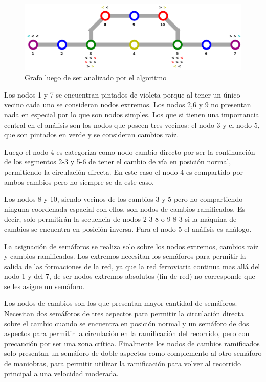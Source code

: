 	\begin{figure}[h]
	\centering
		\includegraphics[scale=.4]{./Figures/Mapa_2}
		\caption{Grafo luego de ser analizado por el algoritmo}
		\label{fig:Mapa}
	\end{figure}

	Los nodos 1 y 7 se encuentran pintados de violeta porque al tener un único vecino cada uno se consideran nodos extremos. Los nodos 2,6 y 9 no presentan nada en especial por lo que son nodos simples. Los que si tienen una importancia central en el análisis son los nodos que poseen tres vecinos: el nodo 3 y el nodo 5, que son pintados en verde y se consideran cambios raíz.

	Luego el nodo 4 es categoriza como nodo cambio directo por ser la continuación de los segmentos 2-3 y 5-6 de tener el cambio de vía en posición normal, permitiendo la circulación directa. En este caso el nodo 4 es compartido por ambos cambios pero no siempre se da este caso.
	
	Los nodos 8 y 10, siendo vecinos de los cambios 3 y 5 pero no compartiendo ninguna coordenada espacial con ellos, son nodos de cambios ramificados. Es decir, solo permitirán la secuencia de nodos 2-3-8 o 9-8-3 si la máquina de cambios se encuentra en posición inversa. Para el nodo 5 el análisis es análogo.

	La asignación de semáforos se realiza solo sobre los nodos extremos, cambios raíz y cambios ramificados. Los extremos necesitan los semáforos para permitir la salida de las formaciones de la red, ya que la red ferroviaria continua mas allá del nodo 1 y del 7, de ser nodos extremos absolutos (fin de red) no corresponde que se les asigne un semáforo.
	
	Los nodos de cambios son los que presentan mayor cantidad de semáforos. Necesitan dos semáforos de tres aspectos para permitir la circulación directa sobre el cambio cuando se encuentra en posición normal y un semáforo de dos aspectos para permitir la circulación en la ramificación del recorrido, pero con precaución por ser una zona crítica. Finalmente los nodos de cambios ramificados solo presentan un semáforo de doble aspectos como complemento al otro semáforo de maniobras, para permitir utilizar la ramificación para volver al recorrido principal a una velocidad moderada. 

